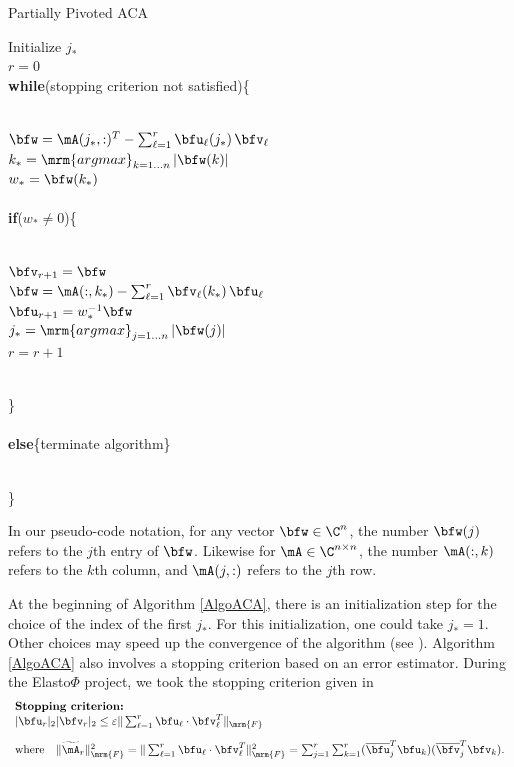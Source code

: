 \begin{algorithm}
  \caption{Partially Pivoted ACA}  
  \label{AlgoACA}
  Initialize $j_{*}$\\
  $r=0$\\
  \textbf{while}(stopping criterion not satisfied)\{\\\quad\\
  \indent\hspace{0.5cm} \parbox{\linewidth}{
    $\bfw = \mA(j_{*},:)^{T} - \sum_{\ell=1}^{r}\bfu_{\ell}(j_{*})\,\bfv_{\ell}$\\
    $k_{*} = \mathop{\mrm{argmax}}_{k = 1\dots n}\vert \bfw(k)\vert$\\
    $w_{*} = \bfw(k_{*})$\\\quad\\
    \textbf{if}($w_{*}\neq 0$)\{\\\quad\\
    \indent\hspace{0.5cm} \parbox{\linewidth}{
      $\bfv_{r+1} = \bfw$\\
      $\bfw = \mA(:,k_{*})-\sum_{\ell = 1}^{r}\bfv_{\ell}(k_{*})\,\bfu_{\ell} $\\
      $\bfu_{r+1} = w_{*}^{-1}\bfw$\\      
      $j_{*} = \mathop{\mrm{argmax}}_{j = 1\dots n} \vert \bfw(j)\vert$\\
      $r=r+1$
    }
    \quad\\
    \}\\\quad\\
    \textbf{else}\{terminate algorithm\}
    }\\
  \}

\end{algorithm}

\bigskip
In our pseudo-code notation, for any vector $\bfw\in \C^{n}$, the number $\bfw(j)$  refers to the $j$th entry of $\bfw$. 
Likewise for $\mA\in \C^{n\times n}$, the number $\mA(:,k)$ refers to the $k$th column, and $\mA(j,:)$ refers to the $j$th
row.

\bigskip
At the beginning of Algorithm \ref{AlgoACA}, there is an initialization step for the choice of the index of the first $j_{*}$. 
For this initialization, one could take $j_{*} = 1$. Other choices may speed up the convergence of the algorithm (see \cite[Section 3.4.3]{Bebendorf2008}). Algorithm \ref{AlgoACA} also involves a stopping criterion based on an error estimator. During the Elasto$\Phi$ 
project, we took the stopping criterion given in \cite{Rjasanow2007}
\begin{equation}
\label{eq:stopCrit}
\begin{array}{l}
\textbf{Stopping criterion:}\\ 
\vert \bfu_{r}\vert_{2}\vert \bfv_{r}\vert_{2}\leq  \varepsilon\Vert \sum_{\ell = 1}^{r}\bfu_{\ell}\cdot\bfv_{\ell}^{T}\Vert_{\mrm{F}}\\[10pt]
\textrm{where}\quad \Vert \widetilde{\mA}_{r} \Vert_{\mrm{F}}^2 =  \Vert \sum_{\ell = 1}^{r}\bfu_{\ell}\cdot\bfv_{\ell}^{T}\Vert_{\mrm{F}}^{2} = \sum_{j=1}^{r}\sum_{k=1}^{r}
(\overline{\bfu}_{j}^{T}\bfu_{k})(\overline{\bfv}_{j}^{T}\bfv_{k}).
\end{array}
\end{equation}

